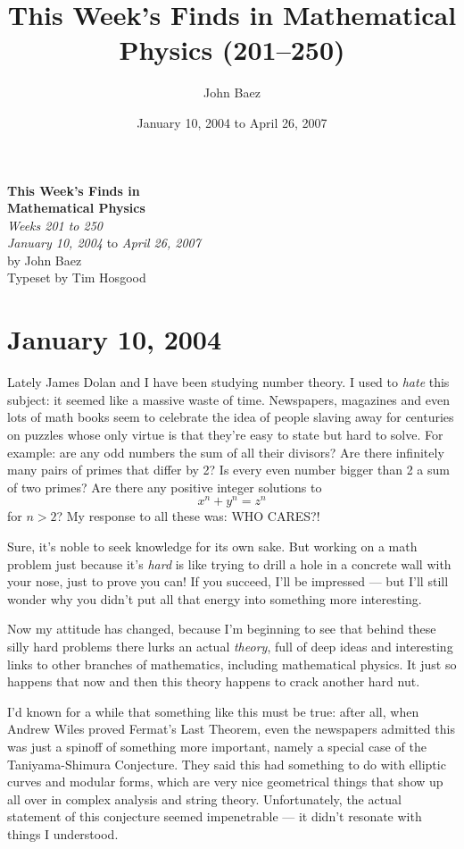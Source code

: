 \documentclass{article}
\title{This Week's Finds in Mathematical Physics (201--250)}
\author{John Baez}
\date{January 10, 2004 to April 26, 2007}
\begin{document}
\begin{titlepage}
  \begin{center}
    {\Huge\textbf{This Week's Finds in}}
  \\[0.7em]{\Huge\textbf{Mathematical Physics}}
  \\[1em]{\huge\textit{Weeks 201 to 250}}
  \\[4em]{\LARGE \textit{January 10, 2004} to \textit{April 26, 2007}}
  \\[4em]{\huge by John Baez}
  \\[0.5em]{\Large{Typeset by Tim Hosgood}}
  \end{center}
\end{titlepage}

\tableofcontents

\hypertarget{week201}{%
\section{January 10, 2004}\label{week201}}

Lately James Dolan and I have been studying number theory. I used to
\emph{hate} this subject: it seemed like a massive waste of time.
Newspapers, magazines and even lots of math books seem to celebrate the
idea of people slaving away for centuries on puzzles whose only virtue
is that they're easy to state but hard to solve. For example: are any
odd numbers the sum of all their divisors? Are there infinitely many
pairs of primes that differ by 2? Is every even number bigger than 2 a
sum of two primes? Are there any positive integer solutions to
\[x^n + y^n = z^n\] for \(n > 2\)? My response to all these was: WHO
CARES?!

Sure, it's noble to seek knowledge for its own sake. But working on a
math problem just because it's \emph{hard} is like trying to drill a
hole in a concrete wall with your nose, just to prove you can! If you
succeed, I'll be impressed --- but I'll still wonder why you didn't put
all that energy into something more interesting.

Now my attitude has changed, because I'm beginning to see that behind
these silly hard problems there lurks an actual \emph{theory}, full of
deep ideas and interesting links to other branches of mathematics,
including mathematical physics. It just so happens that now and then
this theory happens to crack another hard nut.

I'd known for a while that something like this must be true: after all,
when Andrew Wiles proved Fermat's Last Theorem, even the newspapers
admitted this was just a spinoff of something more important, namely a
special case of the Taniyama-Shimura Conjecture. They said this had
something to do with elliptic curves and modular forms, which are very
nice geometrical things that show up all over in complex analysis and
string theory. Unfortunately, the actual statement of this conjecture
seemed impenetrable --- it didn't resonate with things I understood.
\end{document}
